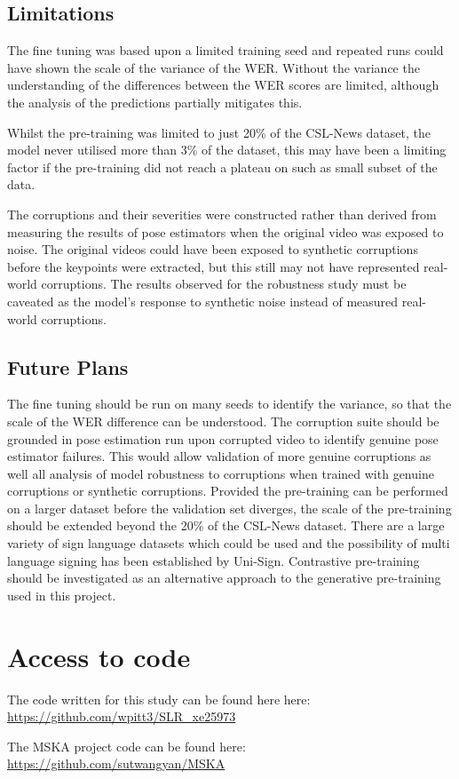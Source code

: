 \documentclass{article}
\begin{document}
\subsection{Limitations}
The fine tuning was based upon a limited training seed and repeated runs could have shown the scale of the variance of the WER. Without the variance the understanding of the differences between the WER scores are limited, although the analysis of the predictions partially mitigates this. 

Whilst the pre-training was limited to just 20\% of the CSL-News dataset, the model never utilised more than 3\% of the dataset, this may have been a limiting factor if the pre-training did not reach a plateau on such as small subset of the data. 

The corruptions and their severities were constructed rather than derived from measuring the results of pose estimators when the original video was exposed to noise. The original videos could have been exposed to synthetic corruptions before the keypoints were extracted, but this still may not have represented real-world corruptions. The results observed for the robustness study must be caveated as the model's response to synthetic noise instead of measured real-world corruptions.

\subsection{Future Plans}
The fine tuning should be run on many seeds to identify the variance, so that the scale of the WER difference can be understood.
The corruption suite should be grounded in pose estimation run upon corrupted video to identify genuine pose estimator failures. This would allow validation of more genuine corruptions as well all analysis of model robustness to corruptions when trained with genuine corruptions or synthetic corruptions.
Provided the pre-training can be performed on a larger dataset before the validation set diverges, the scale of the pre-training should be extended beyond the 20\% of the CSL-News dataset. There are a large variety of sign language datasets which could be used and the possibility of multi language signing has been established by Uni-Sign. Contrastive pre-training should be investigated as an alternative approach to the generative pre-training used in this project.


 
 

\newpage

\appendix
\section{Access to code}

The code written for this study can be found here here: \url{https://github.com/wpitt3/SLR_xe25973}

The MSKA project code can be found here: \url{https://github.com/sutwangyan/MSKA}

\end{document}

